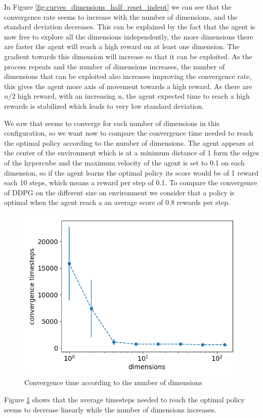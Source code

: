 \documentclass{article}
\begin{document}
In Figure \ref{fig:curves_dimensions_half_reset_indept} we can see that the convergence rate seems to increase with the number of dimensions, and the standard deviation decreases. This can be explained by the fact that the agent is now free to explore all the dimensions independently, the more dimensions there are faster the agent will reach a high reward on at least one dimension. The gradient towards this dimension will increase so that it can be exploited. As the process repeats and the number of dimensions increases, the number of dimensions that can be exploited also increases improving the convergence rate, this gives the agent more axis of movement towards a high reward. As there are $n/2$ high reward, with an increasing n, the agent expected time to reach a high rewards is stabilized which leads to very low standard deviation.

We saw that seems to converge for each number of dimensions in this configuration, so we want now to compare the convergence time needed to reach the optimal policy according to the number of dimensions. The agent appears at the center of the environment which is at a minimum distance of 1 form the edges of the hypercube and the maximum velocity of the agent is set to 0.1 on each dimension, so if the agent learns the optimal policy its score would be of 1 reward each 10 steps, which means a reward per step of 0.1. To compare the convergence of DDPG on the different size on environment we consider that a policy is optimal when the agent reach a an average score of $0.8$ rewards per step. 
 
\begin{figure}[H]
  \centering
  \includegraphics[width=0.5\linewidth]{Study_3/half_convergence_reset_indept/convergences.png}
  \caption{Convergence time according to the number of dimensions}
  \label{fig:convergence}
  \vspace{2cm}
\end{figure}

Figure \ref{fig:convergence} shows that the average timesteps needed to reach the optimal policy seems to decrease linearly while the number of dimensions increases.
\end{document}
